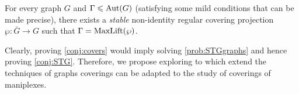 \documentclass[a4paper,12pt,english]{article}
\begin{document}
\begin{conj}\label{conj:covers}
  For every graph $G$  and $\Gamma \leqslant \operatorname{Aut}(G)$ (satisfying some mild conditions that can be made precise), there exists a \emph{ stable} non-identity regular covering projection $\wp \colon \bar{G} \to G$ 
such that $\Gamma = \operatorname{MaxLift}(\wp)$.
\end{conj}

Clearly, proving \cref{conj:covers} would imply solving \cref{prob:STGgraphs} and hence proving \cref{conj:STG}. Therefore, we propose exploring to which extend the techniques of graphs coverings can be adapted to the study of coverings of maniplexes. 




\printbibliography






 
\end{document}
